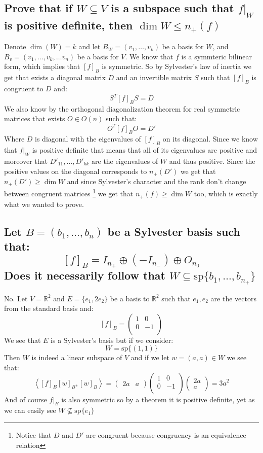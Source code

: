 \documentclass[11pt,a4paper]{article}
\theoremstyle{plain}
\newcommand{\R}{\mathbb{R}}
\newcommand{\ip}[2]{\left\langle #1, #2 \right\rangle}
\begin{document}
	\subsection{Prove that if $W\subseteq V$ is a subspace such that $f\vert_W$ 
	is positive definite, then $\dim W \le n_{+}(f)$}
	Denote $\dim (W) = k$ and
	let $B_W = (v_1,\dots,v_{k})$ be a basis for $W$, and
	$B_v = (v_1,\dots,v_{k},\dots v_n)$ be a basis for $V$.
	We know that $f$ is a symmteric bilinear form, which implies that $[f]_B$ is 
	symmetric. So by Sylvester's law of inertia we get that exists a diagonal 
	matrix $D$ and an invertible matrix $S$ such that $[f]_B$ is congruent to $D$ 
	and:
	\[
		S^{T}[f]_BS = D
	\]
	We also know by the orthogonal diagonalization theorem for real symmetric
	matrices that exists $O\in O(n)$ such that:
	\[
		O^{T}[f]_BO = D'
	\]
	Where $D$ is diagonal with the eigenvalues of $[f]_B$ on its diagonal.
	Since we know that $f\vert_W$ is positive definite that means that all
	of its eigenvalues are positive and moreover that $D'_{11},\dots,D'_{kk}$
	are the eigenvalues of $W$ and thus positive.
	Since the positive values on the diagonal corresponds to $n_+(D')$
	we get that $n_+(D') \geq \dim W$ and since Sylvester's character
	and the rank don't change between congruent matrices
	\footnote{Notice that $D$ and $D'$ are congruent because congruency
	is an equivalence relation} 
	we get that
	$n_+(f) \geq \dim W$ too, which is exactly what we wanted to prove.
	
	\newpage
	
	\subsection{Let $B = (b_1,\dots,b_n)$ be a Sylvester basis such that:
	\[
		[f]_B = I_{n_{+}} \oplus (-I_{n_{-}}) \oplus O_{n_{0}}
	\]
	Does it necessarily follow that 
	$W\subseteq \mathrm{sp}\{b_1,\dots,b_{n_{+}}\}$}
	No. Let $V = \R^2$ and $E = \{e_1,2e_2\}$ be a basis to $\R^2$ such that
	$e_1,e_2$ are the vectors from the standard basis and:
	\[
		[f]_B = 
		\begin{pmatrix}
			1 & 0 \\
			0 & -1 \\
		\end{pmatrix}
	\]
	We see that $E$ is a Sylvester's basis but if we consider:
	\[
		W = \mathrm{sp}\{(1,1)\}
	\]
	Then $W$ is indeed a linear subspace of $V$ and if we let $w=(a,a)\in W$
	we see that:
	\[
		\ip{[f]_B[w]_B}{[w]_B} = 
		\begin{pmatrix}
		2a & a
		\end{pmatrix}
		\begin{pmatrix}
			1 & 0 \\
			0 & -1 \\
		\end{pmatrix}
		\begin{pmatrix}
		2a \\ a
		\end{pmatrix} = 3a^2
	\]
	And of course $f\vert_B$ is also symmetric so by a theorem it is 
	positive definite, yet as we can easily see $W \nsubseteq \mathrm{sp}\{e_1\}$
	
\end{document}

